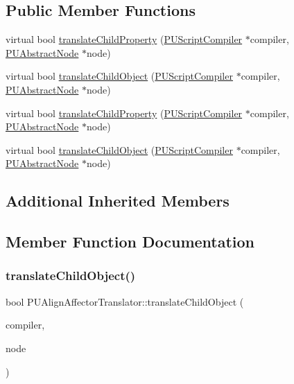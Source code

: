 \subsection*{Public Member Functions}
\begin{DoxyCompactItemize}
\item 
virtual bool \hyperlink{classPUAlignAffectorTranslator_a5e64d895bfa3c7fb44fdece8f77946d7}{translate\+Child\+Property} (\hyperlink{classPUScriptCompiler}{P\+U\+Script\+Compiler} $\ast$compiler, \hyperlink{classPUAbstractNode}{P\+U\+Abstract\+Node} $\ast$node)
\item 
virtual bool \hyperlink{classPUAlignAffectorTranslator_aacb8a070d6abc25d13db017e808033e9}{translate\+Child\+Object} (\hyperlink{classPUScriptCompiler}{P\+U\+Script\+Compiler} $\ast$compiler, \hyperlink{classPUAbstractNode}{P\+U\+Abstract\+Node} $\ast$node)
\item 
virtual bool \hyperlink{classPUAlignAffectorTranslator_a5176eccdcd921162e7a1e5483f130c20}{translate\+Child\+Property} (\hyperlink{classPUScriptCompiler}{P\+U\+Script\+Compiler} $\ast$compiler, \hyperlink{classPUAbstractNode}{P\+U\+Abstract\+Node} $\ast$node)
\item 
virtual bool \hyperlink{classPUAlignAffectorTranslator_ade62ab4eaeff6a9c9eea6b01437c8433}{translate\+Child\+Object} (\hyperlink{classPUScriptCompiler}{P\+U\+Script\+Compiler} $\ast$compiler, \hyperlink{classPUAbstractNode}{P\+U\+Abstract\+Node} $\ast$node)
\end{DoxyCompactItemize}
\subsection*{Additional Inherited Members}


\subsection{Member Function Documentation}
\mbox{\label{classPUAlignAffectorTranslator_aacb8a070d6abc25d13db017e808033e9}} 
\subsubsection{\texorpdfstring{translate\+Child\+Object()}{translateChildObject()}\hspace{0.1cm}{\footnotesize\ttfamily [1/2]}}
{\footnotesize\ttfamily bool P\+U\+Align\+Affector\+Translator\+::translate\+Child\+Object (\begin{DoxyParamCaption}\item[{\hyperlink{classPUScriptCompiler}{P\+U\+Script\+Compiler} $\ast$}]{compiler,  }\item[{\hyperlink{classPUAbstractNode}{P\+U\+Abstract\+Node} $\ast$}]{node }\end{DoxyParamCaption})\hspace{0.3cm}{\ttfamily [virtual]}}

